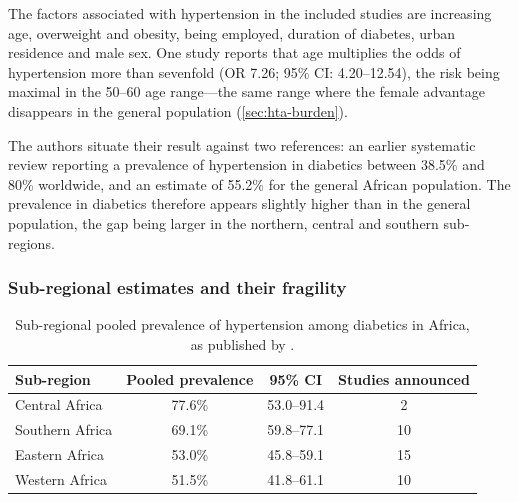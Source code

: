 \documentclass[12pt,a4paper,oneside]{report}
\begin{document}
The factors associated with hypertension in the included studies are increasing age, overweight and obesity, being employed, duration of diabetes, urban residence and male sex. One study reports that age multiplies the odds of hypertension more than sevenfold (OR 7.26; 95\% CI: 4.20--12.54), the risk being maximal in the 50--60 age range---the same range where the female advantage disappears in the general population (\cref{sec:hta-burden}).

The authors situate their result against two references: an earlier systematic review reporting a prevalence of hypertension in diabetics between 38.5\% and 80\% worldwide, and an estimate of 55.2\% for the general African population. The prevalence in diabetics therefore appears slightly higher than in the general population, the gap being larger in the northern, central and southern sub-regions.

\subsubsection{Sub-regional estimates and their fragility}\label{sec:central-estimates}

\begin{table}[htbp]
\centering\small
\caption{Sub-regional pooled prevalence of hypertension among diabetics in Africa, as published by \textcite{hinneh2023}.}\label{tab:subregional}
\begin{tabular}{@{}lccc@{}}
\toprule
\textbf{Sub-region} & \textbf{Pooled prevalence} & \textbf{95\% CI} & \textbf{Studies announced} \\
\midrule
Central Africa & 77.6\% & 53.0--91.4 & 2 \\
Southern Africa & 69.1\% & 59.8--77.1 & 10 \\
Eastern Africa & 53.0\% & 45.8--59.1 & 15 \\
Western Africa & 51.5\% & 41.8--61.1 & 10 \\
\bottomrule
\end{tabular}
\end{table}
\end{document}
